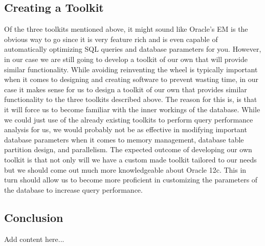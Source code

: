 \documentclass[draftclsnofoot, onecolumn, compsoc, 10pt]{IEEEtran}
\begin{document}
\subsection{Creating a Toolkit}
Of the three toolkits mentioned above, it might sound like Oracle’s EM is the obvious way to go since it is very feature rich and is even capable of automatically optimizing SQL queries and database parameters for you. 
However, in our case we are still going to develop a toolkit of our own that will provide similar functionality. 
While avoiding reinventing the wheel is typically important when it comes to designing and creating software to prevent wasting time, in our case it makes sense for us to design a toolkit of our own that provides similar functionality to the three toolkits described above. 
The reason for this is, is that it will force us to become familiar with the inner workings of the database. 
While we could just use of the already existing toolkits to perform query performance analysis for us, we would probably not be as effective in modifying important database parameters when it comes to memory management, database table partition design, and parallelism. 
The expected outcome of developing our own toolkit is that not only will we have a custom made toolkit tailored to our needs but we should come out much more knowledgeable about Oracle 12c. 
This in turn should allow us to become more proficient in customizing the parameters of the database to increase query performance.

\subsection{Conclusion}
Add content here...
\end{document}
